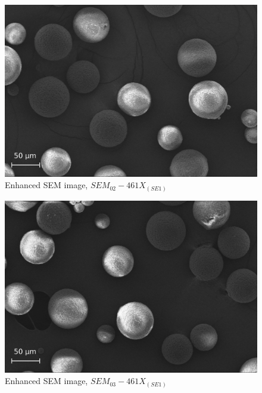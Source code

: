 \documentclass{article}
\begin{document}
                \begin{figure}[h!]
                    \centering 
                    \includegraphics[width=\textwidth]{Pictures/SEM/Edited/04_02.eps}
                    \caption{Enhanced SEM image, $SEM_{02}-461X_{(SE1)}$ \autocites{Pixelmator_Pro}{GIMP}}
                    \label{fig:SEM_02}
                \end{figure}

                \begin{figure}[h!]
                    \centering 
                    \includegraphics[width=\textwidth]{Pictures/SEM/Edited/04_03.eps}
                    \caption{Enhanced SEM image, $SEM_{03}-461X_{(SE1)}$ \autocites{Pixelmator_Pro}{GIMP}}
                    \label{fig:SEM_03}
                \end{figure}
\end{document}
